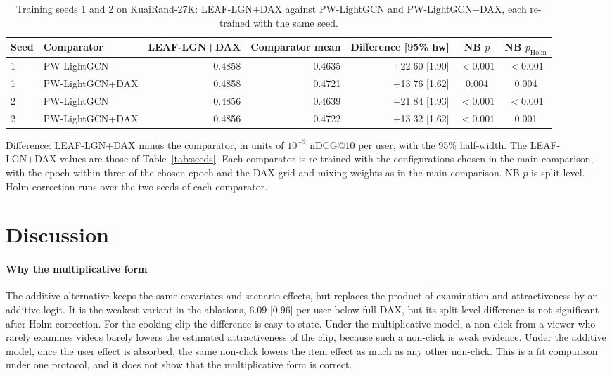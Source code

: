 \documentclass[preprint,12pt,authoryear]{elsarticle}
\begin{document}
\begin{table}[tbp]
\centering
\footnotesize
\caption{Training seeds 1 and 2 on KuaiRand-27K: LEAF-LGN+DAX against PW-LightGCN and PW-LightGCN+DAX, each re-trained with the same seed.}
\label{tab:seeds-pw}
\begin{adjustbox}{max width=\linewidth}
\begin{tabular}{llrrrcc}
\toprule
Seed & Comparator & LEAF-LGN+DAX & Comparator mean & Difference [95\% hw] & NB $p$ & NB $p_{\mathrm{Holm}}$ \\
\midrule
1 & PW-LightGCN & 0.4858 & 0.4635 & +22.60 [1.90] & $<0.001$ & $<0.001$ \\
1 & PW-LightGCN+DAX & 0.4858 & 0.4721 & +13.76 [1.62] & 0.004 & 0.004 \\
2 & PW-LightGCN & 0.4856 & 0.4639 & +21.84 [1.93] & $<0.001$ & $<0.001$ \\
2 & PW-LightGCN+DAX & 0.4856 & 0.4722 & +13.32 [1.62] & $<0.001$ & 0.001 \\
\bottomrule
\end{tabular}
\end{adjustbox}
\par\smallskip
\begin{minipage}{\linewidth}\raggedright\footnotesize Difference: LEAF-LGN+DAX minus the comparator, in units of $10^{-3}$ nDCG@10 per user, with the 95\% half-width. The LEAF-LGN+DAX values are those of Table~\ref{tab:seeds}. Each comparator is re-trained with the configurations chosen in the main comparison, with the epoch within three of the chosen epoch and the DAX grid and mixing weights as in the main comparison. NB $p$ is split-level. Holm correction runs over the two seeds of each comparator.\end{minipage}
\end{table}

\section{Discussion}
\label{sec:discussion}

\paragraph{Why the multiplicative form} The additive alternative keeps the same covariates and scenario effects, but replaces the product of
examination and attractiveness by an additive logit. It is the weakest variant in the ablations, $6.09$ [0.96] per user below full DAX, but its split-level
difference is not significant after Holm correction. For the cooking clip the difference is easy to state. Under the multiplicative model, a
non-click from a viewer who rarely examines videos barely lowers the estimated attractiveness of the clip, because such a non-click is weak
evidence. Under the additive model, once the user effect is absorbed, the same non-click lowers the item effect as much as any other
non-click. This is a fit comparison under one protocol, and it does not show that the multiplicative form is correct.
\end{document}
